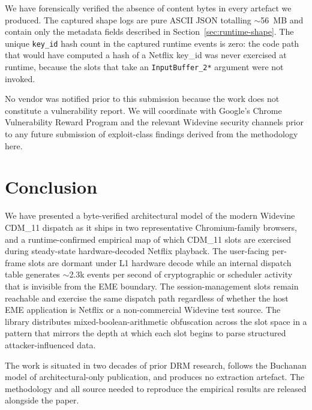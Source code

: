 \documentclass[11pt,letterpaper]{article}
\begin{document}
We have forensically verified the absence of content bytes in every
artefact we produced. The captured shape logs are pure ASCII JSON
totalling $\sim$56~MB and contain only the metadata fields described
in Section~\ref{sec:runtime-shape}. The unique \texttt{key\_id}
hash count in the captured runtime events is zero: the code path
that would have computed a hash of a Netflix key\_id was never
exercised at runtime, because the slots that take an
\texttt{InputBuffer\_2*} argument were not invoked.

No vendor was notified prior to this submission because the work
does not constitute a vulnerability report. We will coordinate with
Google's Chrome Vulnerability Reward Program and the relevant
Widevine security channels prior to any future submission of
exploit-class findings derived from the methodology here.

\section{Conclusion}
\label{sec:conclusion}

We have presented a byte-verified architectural model of the modern
Widevine CDM\_11 dispatch as it ships in two representative
Chromium-family browsers, and a runtime-confirmed empirical map of
which CDM\_11 slots are exercised during steady-state
hardware-decoded Netflix playback. The user-facing per-frame slots
are dormant under L1 hardware decode while an internal dispatch
table generates $\sim$2.3k events per second of cryptographic or
scheduler activity that is invisible from the EME boundary. The
session-management slots remain reachable and exercise the same
dispatch path regardless of whether the host EME application is
Netflix or a non-commercial Widevine test source. The library
distributes mixed-boolean-arithmetic obfuscation across the slot
space in a pattern that mirrors the depth at which each slot
begins to parse structured attacker-influenced data.

The work is situated in two decades of prior DRM research, follows
the Buchanan model of architectural-only publication, and produces
no extraction artefact. The methodology and all source needed to
reproduce the empirical results are released alongside the paper.
\end{document}
